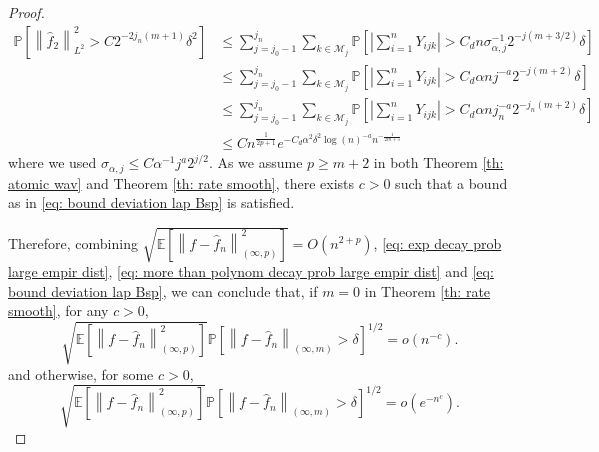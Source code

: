 \documentclass[preprint]{imsart}
\newcommand\norm[1]{\left\lVert#1\right\rVert}
\numberwithin{equation}{section}
\begin{document}
\begin{appendix}
\begin{proof}
\begin{align*}
\mathbb{P}\left[\norm{\hat{f}_2}_{L^2}^2> C2^{-2j_n(m+1)}\delta^2\right]&\leq \sum_{j=j_0-1}^{j_n} \sum_{k\in\mathcal{M}_j} \mathbb{P}\left[   \left|\sum_{i=1}^nY_{ijk}\right|>C_dn\sigma_{\alpha,j}^{-1} 2^{-j(m+3/2)}\delta\right]\nonumber\\
&\leq \sum_{j=j_0-1}^{j_n} \sum_{k\in\mathcal{M}_j} \mathbb{P}\left[  \left|\sum_{i=1}^nY_{ijk}\right|>C_d\alpha n j^{-a}2^{-j(m+2)}\delta\right]\nonumber\\
&\leq \sum_{j=j_0-1}^{j_n} \sum_{k\in\mathcal{M}_j} \mathbb{P}\left[  \left|\sum_{i=1}^nY_{ijk}\right|>C_d\alpha n j_n^{-a}2^{-j_n(m+2)}\delta\right]\nonumber\\
&\leq Cn^{\frac{1}{2p+1}}e^{-C_d\alpha^2 \delta^2 \log(n)^{-a} n^{-\frac{1}{2m+5}}}
\end{align*}
where we used $\sigma_{\alpha,j}\leq C\alpha^{-1} j^a 2^{j/2}$. As we assume $p\geq m+2$ in both Theorem \ref{th: atomic wav} and Theorem \ref{th: rate smooth}, there exists $c>0$ such that a bound as in \eqref{eq: bound deviation lap Bsp} is satisfied.



Therefore, combining $\sqrt{\mathbb{E}\left[\norm{f-\hat{f}_n}_{(\infty,p)}^2\right]}=O(n^{2+p})$, \eqref{eq: exp decay prob large empir dist}, \eqref{eq: more than polynom decay prob large empir dist}  and \eqref{eq: bound deviation lap Bsp}, we can conclude that, if $m=0$ in Theorem \ref{th: rate smooth}, for any $c>0$,
\[\sqrt{\mathbb{E}\left[\norm{f-\hat{f}_n}_{(\infty,p)}^2\right]}\mathbb{P}\left[\norm{f-\hat{f}_n}_{(\infty,m)}> \delta\right]^{1/2}= o(n^{-c}).\]
and otherwise, for some $c>0$,
\[\sqrt{\mathbb{E}\left[\norm{f-\hat{f}_n}_{(\infty,p)}^2\right]}\mathbb{P}\left[\norm{f-\hat{f}_n}_{(\infty,m)}> \delta\right]^{1/2}= o(e^{-n^{c}}).\]


\end{proof}
\end{appendix}
\end{document}
